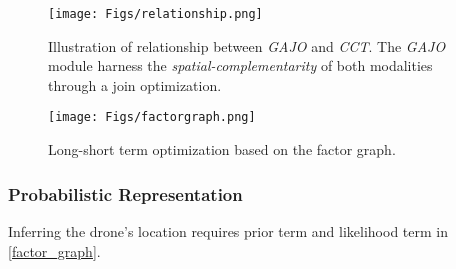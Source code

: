 \begin{figure}[t]
    \setlength{\belowcaptionskip}{-0.2cm}
    \setlength{\subfigcapskip}{-0.6cm}
    \centering
        \texttt{[image: Figs/relationship.png]}
        \vspace{-0.4cm}
    \caption{Illustration of relationship between \textit{GAJO} and \textit{CCT}. \textnormal{The \textit{GAJO} module harness the \textit{spatial-complementarity} of both modalities through a join optimization.}}
    \label{relationship}
    \vspace{-0.5cm}
\end{figure} 


\begin{figure*}[t]
    \setlength{\abovecaptionskip}{0.05cm} %
    \setlength{\belowcaptionskip}{-0.3cm}
    \setlength{\subfigcapskip}{-0.25cm}
    \centering
        \texttt{[image: Figs/factorgraph.png]}
    \caption{Long-short term optimization based on the factor graph.}
    \label{factorgraph}
    \vspace{-0.25cm}
\end{figure*} 


\subsubsection{\textbf{Probabilistic Representation}} \label{4.2.2}
Inferring the drone's location requires prior term and likelihood term in \eqn \eqref{factor_graph}.

